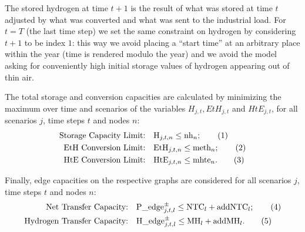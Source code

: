 The stored hydrogen at time $t+1$ is the result of what was stored at time $t$ adjusted by what was converted and what was sent to the industrial load. 
For $t=T$ (the last time step) we set the same constraint on hydrogen by considering $t+1$ to be index $1$: this way we avoid placing a ``start time'' at an arbitrary place within the year (time is rendered modulo the year) and we avoid the model asking for conveniently high initial storage values of hydrogen appearing out of thin air.

The total storage and conversion capacities are calculated by minimizing the maximum over time and scenarios of the variables $H_{j,t}, EtH_{j,t}$ and $HtE_{j,t}$, for all scenarios \(j\), time steps \(t\) and nodes \(n\):
\begin{align*}
    \text{Storage Capacity Limit:} \quad & \text{H}_{j,t,n} \leq \text{nh}_n ;\stepcounter{equation}\tag{\theequation}\label{constr_nh}\\
    \text{EtH Conversion Limit:} \quad & \text{EtH}_{j,t,n} \leq \text{meth}_n; \stepcounter{equation}\tag{\theequation}\label{constr_meth}\\
    \text{HtE Conversion Limit:} \quad & \text{HtE}_{j,t,n} \leq \text{mhte}_n .\stepcounter{equation}\tag{\theequation}\label{constr_mhte}
\end{align*}

Finally, edge capacities on the respective graphs are considered for all scenarios \(j\), time steps \(t\) and nodes \(n\):
\begin{align*}
    \text{Net Transfer Capacity:} \quad & \text{P\_edge}^\pm_{j,t,l}\le\text{NTC}_l + \text{addNTC}_l ;\stepcounter{equation}\tag{\theequation}\label{constr_NTC}\\
    \text{Hydrogen Transfer Capacity:} \quad & \text{H\_edge}^\pm_{j,t,l}\le\text{MH}_l + \text{addMH}_l.\stepcounter{equation}\tag{\theequation}\label{constr_MH}
\end{align*}





























